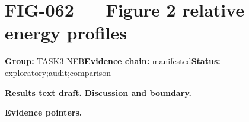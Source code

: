 \clearpage
\section{FIG-062 --- Figure 2 relative energy profiles}
\label{figpage:fig-062}
\textbf{Group:} TASK3-NEB\quad \textbf{Evidence chain:} manifested\quad \textbf{Status:} exploratory;audit;comparison

\textbf{Results text draft.} 
\textbf{Discussion and boundary.} 


\textbf{Evidence pointers.}



\vfill
